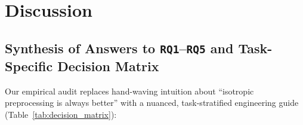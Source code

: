 \documentclass[10pt,a4paper]{article}
\renewcommand{\_}{\origunderscore\allowbreak}
\begin{document}
\clearpage
\section{Discussion}
\label{sec:discussion}

\subsection{Synthesis of Answers to \texttt{RQ1}--\texttt{RQ5} and Task-Specific Decision Matrix}
\label{sec:disc_rqs}

Our empirical audit replaces hand-waving intuition about ``isotropic preprocessing is always better'' with a nuanced, task-stratified engineering guide (Table~\ref{tab:decision_matrix}):
\end{document}
